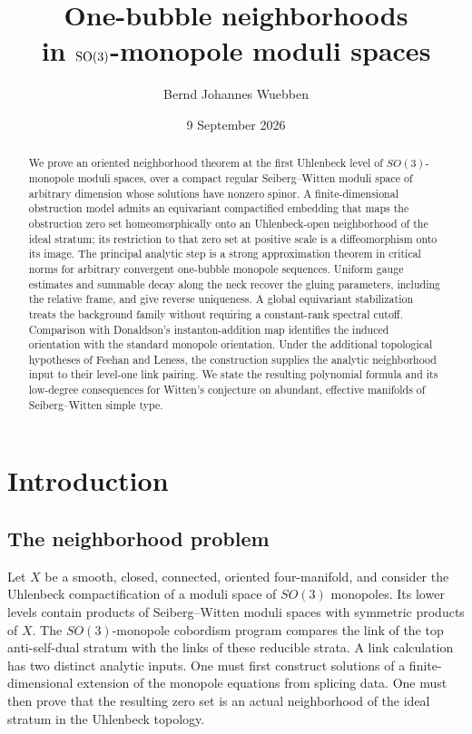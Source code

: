 \documentclass[11pt]{amsart}
\title[One-bubble neighborhoods]
{One-bubble neighborhoods\\
in $\operatorname{SO}(3)$-monopole moduli spaces}
\author{Bernd Johannes Wuebben}
\date{9 September 2026}
\theoremstyle{definition}
\theoremstyle{remark}
\theoremstyle{plain}
\begin{document}
\begin{abstract}
We prove an oriented neighborhood theorem at the first Uhlenbeck level
of $SO(3)$-monopole moduli spaces, over a compact regular
Seiberg--Witten moduli space of arbitrary dimension whose solutions have
nonzero spinor.  A finite-dimensional obstruction model admits an
equivariant compactified embedding that maps the obstruction zero set
homeomorphically onto an Uhlenbeck-open neighborhood of the ideal stratum;
its restriction to that zero set at
positive scale is a diffeomorphism onto its image.  The principal analytic
step is a strong approximation theorem in critical norms for arbitrary
convergent one-bubble monopole sequences.  Uniform gauge estimates and
summable decay along the neck recover the gluing parameters, including
the relative frame, and give reverse uniqueness.  A global equivariant
stabilization treats the background family without requiring a
constant-rank spectral cutoff.  Comparison with Donaldson's
instanton-addition map identifies the induced orientation with the
standard monopole orientation.  Under the additional topological
hypotheses of Feehan and Leness, the construction supplies the analytic
neighborhood input to their level-one link pairing.  We state the
resulting polynomial formula and its low-degree consequences for Witten's
conjecture on abundant, effective manifolds of Seiberg--Witten simple type.
\end{abstract}

\maketitle
\enlargethispage{6pt}

\section{Introduction}\label{sec:introduction}

\subsection{The neighborhood problem}
Let $X$ be a smooth, closed, connected, oriented four-manifold, and consider
the Uhlenbeck compactification of a moduli space of $SO(3)$ monopoles.  Its
lower levels contain products of Seiberg--Witten moduli spaces with symmetric
products of $X$.  The $SO(3)$-monopole cobordism program compares the link of
the top anti-self-dual stratum with the links of these reducible strata.  A
link calculation has two distinct analytic inputs.  One must first construct
solutions of a finite-dimensional extension of the monopole equations from
splicing data.  One must then prove that the resulting zero set is an actual
neighborhood of the ideal stratum in the Uhlenbeck topology.
\end{document}
